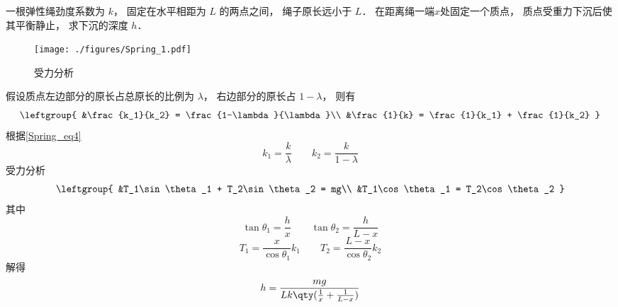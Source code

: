 \begin{example}{}
一根弹性绳劲度系数为 $k$， 固定在水平相距为 $L$ 的两点之间， 绳子原长远小于 $L$． 在距离绳一端$x$处固定一个质点， 质点受重力下沉后使其平衡静止， 求下沉的深度 $h$．
\begin{figure}[ht]
\centering
\texttt{[image: ./figures/Spring\_1.pdf]}
\caption{受力分析} \label{Spring_fig1}
\end{figure}
假设质点左边部分的原长占总原长的比例为 $\lambda$， 右边部分的原长占 $1-\lambda$， 则有
\begin{equation}
\leftgroup{
&\frac{k_1}{k_2} = \frac{1-\lambda}{\lambda}\\
&\frac{1}{k} = \frac{1}{k_1} + \frac{1}{k_2}
}
\end{equation}
根据\autoref{Spring_eq4} 
\begin{equation}
k_1 = \frac{k}{\lambda} \qquad
k_2 = \frac{k}{1-\lambda}
\end{equation}
受力分析
\begin{equation}
\leftgroup{
&T_1\sin\theta_1 + T_2\sin\theta_2 = mg\\
&T_1\cos\theta_1 = T_2\cos\theta_2
}
\end{equation}
其中
\begin{equation}
\tan\theta_1 = \frac{h}{x}
\qquad
\tan\theta_2 = \frac{h}{L-x}
\end{equation}
\begin{equation}
T_1 = \frac{x}{\cos\theta_1} k_1 \qquad
T_2 = \frac{L-x}{\cos\theta_2} k_2
\end{equation}
解得
\begin{equation}
h = \frac{mg}{Lk\qty(\frac{1}{x} + \frac{1}{L-x})}
\end{equation}
\end{example}
